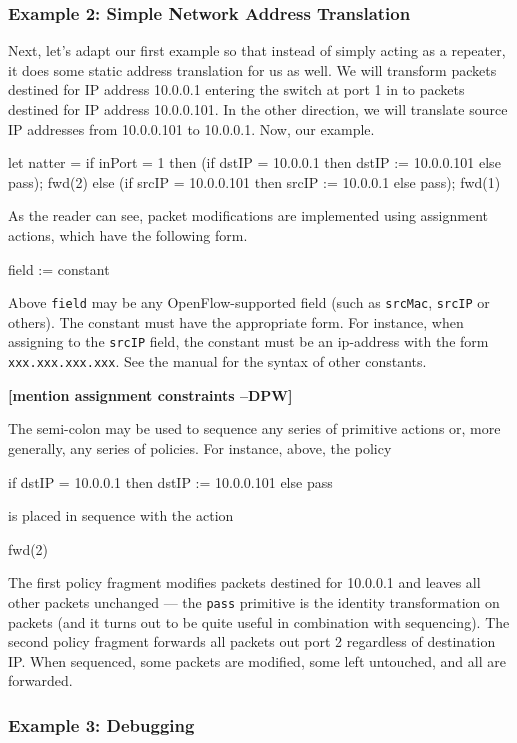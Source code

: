 \documentclass{article}
\newcommand{\finish}[2][cornellred]{\ifdraft\textcolor{#1}{\textbf{[#2]}}\fi}
\newcommand{\dpw}[1]{\finish[cornellred]{#1 --DPW}}
\newcommand{\code}[1]{\texttt{#1}}
\begin{document}
\subsubsection{Example 2: Simple Network Address Translation}

Next, let's adapt our first example so that instead of simply acting
as a repeater, it does some static address translation for us as well.
We will transform packets destined for IP address 10.0.0.1 entering the 
switch at port 1 in to packets destined for IP address 10.0.0.101.
In the other direction, we will translate source IP addresses from
10.0.0.101 to 10.0.0.1.  Now, our example.
%
\begin{progeg}
let natter =
  if inPort = 1 then
    (if dstIP = 10.0.0.1 then dstIP := 10.0.0.101 else pass); 
    fwd(2)
  else 
    (if srcIP = 10.0.0.101 then srcIP := 10.0.0.1 else pass); 
    fwd(1)
\end{progeg}
%
As the reader can see, packet modifications are implemented using
assignment actions, which have the following form.
%
\begin{progeg}
field := constant
\end{progeg}
%
Above \code{field} may be any OpenFlow-supported field (such as 
\code{srcMac}, \code{srcIP} or others).  The constant must have the
appropriate form.  For instance, when assigning to the \code{srcIP}
field, the constant must be an ip-address with the form 
\code{xxx.xxx.xxx.xxx}.  See the manual for the syntax of other
constants.

\dpw{mention assignment constraints}

The semi-colon may be used to sequence any series of primitive actions
or, more generally, any series of policies.  For instance, above, the policy
%
\begin{progeg}
if dstIP = 10.0.0.1 then dstIP := 10.0.0.101 else pass
\end{progeg}
%
is placed in sequence with the action
%
\begin{progeg}
fwd(2)
\end{progeg}
%
The first policy fragment modifies packets destined for 10.0.0.1 and leaves
all other packets unchanged --- the \code{pass} primitive is the identity
transformation on packets (and it turns out to be quite useful in
combination with sequencing). The second policy fragment 
forwards all packets out port 2 regardless
of destination IP.  When sequenced, some packets are modified, some left
untouched, and all are forwarded.

\subsubsection{Example 3: Debugging}
\end{document}
